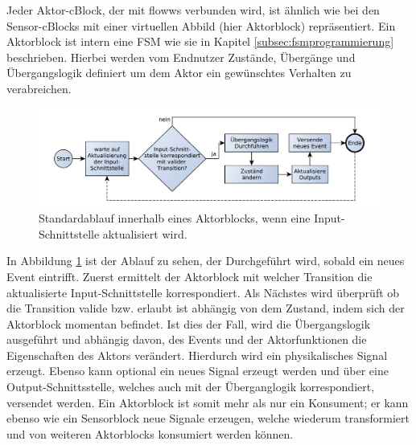 Jeder Aktor-cBlock, der mit flowws verbunden wird, ist ähnlich wie bei den Sensor-cBlocks mit einer virtuellen Abbild (hier Aktorblock) repräsentiert. Ein Aktorblock ist intern eine \ac{FSM} wie sie in Kapitel \ref{subsec:fsmprogrammierung} beschrieben. Hierbei werden vom Endnutzer Zustände, Übergänge und Übergangslogik definiert um dem Aktor ein gewünschtes Verhalten zu verabreichen.

 \begin{figure}[h]
  \centering
  \includegraphics[width=1\textwidth]{bilder/chapter4/chapter4_2/aktorblockablauf.pdf}
  \caption{Standardablauf innerhalb eines Aktorblocks, wenn eine Input-Schnittstelle aktualisiert wird.}
  \label{fig:seqfunktionsblock}
\end{figure}

In Abbildung \ref{fig:seqfunktionsblock} ist der Ablauf zu sehen, der Durchgeführt wird, sobald ein neues Event eintrifft. Zuerst ermittelt der Aktorblock mit welcher Transition die aktualisierte Input-Schnittstelle korrespondiert. Als Nächstes wird überprüft ob die Transition valide bzw. erlaubt ist abhängig von dem Zustand, indem sich der Aktorblock momentan befindet. Ist dies der Fall, wird die Übergangslogik ausgeführt und abhängig davon, des Events und der Aktorfunktionen die Eigenschaften des Aktors verändert. Hierdurch wird ein physikalisches Signal erzeugt. Ebenso kann optional ein neues Signal erzeugt werden und über eine Output-Schnittsstelle, welches auch mit der Überganglogik korrespondiert, versendet werden. Ein Aktorblock ist somit mehr als nur ein Konsument; er kann ebenso wie ein Sensorblock neue Signale erzeugen, welche wiederum transformiert und von weiteren Aktorblocks konsumiert werden können.

